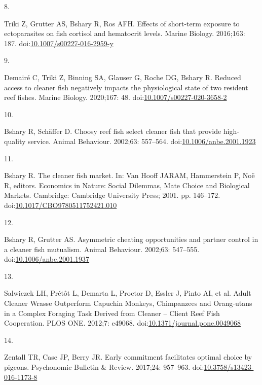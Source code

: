 \documentclass[10pt,letterpaper]{article}
\newlength{\cslhangindent}
\newlength{\csllabelwidth}
\newlength{\cslentryspacingunit} %
\newenvironment{CSLReferences}[2] %
 {%
  \setlength{\parindent}{0pt}
  \ifodd #1
  \let\oldpar\par
  \def\par{\hangindent=\cslhangindent\oldpar}
  \fi
  \setlength{\parskip}{#2\cslentryspacingunit}
 }%
 {}
\newcommand{\CSLLeftMargin}[1]{\parbox[t]{\csllabelwidth}{#1}}
\newcommand{\CSLRightInline}[1]{\parbox[t]{\linewidth - \csllabelwidth}{#1}\break}
\begin{document}
\begin{CSLReferences}{0}{0}
\leavevmode{}%
\CSLLeftMargin{8. }
\CSLRightInline{Triki Z, Grutter AS, Bshary R, Ros AFH. Effects of
short-term exposure to ectoparasites on fish cortisol and hematocrit
levels. Marine Biology. 2016;163: 187.
doi:\href{https://doi.org/10.1007/s00227-016-2959-y}{10.1007/s00227-016-2959-y}}

\leavevmode{}%
\CSLLeftMargin{9. }
\CSLRightInline{Demairé C, Triki Z, Binning SA, Glauser G, Roche DG,
Bshary R. Reduced access to cleaner fish negatively impacts the
physiological state of two resident reef fishes. Marine Biology.
2020;167: 48.
doi:\href{https://doi.org/10.1007/s00227-020-3658-2}{10.1007/s00227-020-3658-2}}

\leavevmode{}%
\CSLLeftMargin{10. }
\CSLRightInline{Bshary R, Schäffer D. Choosy reef fish select cleaner
fish that provide high-quality service. Animal Behaviour. 2002;63:
557--564.
doi:\href{https://doi.org/10.1006/anbe.2001.1923}{10.1006/anbe.2001.1923}}

\leavevmode{}%
\CSLLeftMargin{11. }
\CSLRightInline{Bshary R. The cleaner fish market. In: Van Hooff JARAM,
Hammerstein P, Noë R, editors. Economics in {Nature}: {Social}
{Dilemmas}, {Mate} {Choice} and {Biological} {Markets}. Cambridge:
Cambridge University Press; 2001. pp. 146--172.
doi:\href{https://doi.org/10.1017/CBO9780511752421.010}{10.1017/CBO9780511752421.010}}

\leavevmode{}%
\CSLLeftMargin{12. }
\CSLRightInline{Bshary R, Grutter AS. Asymmetric cheating opportunities
and partner control in a cleaner fish mutualism. Animal Behaviour.
2002;63: 547--555.
doi:\href{https://doi.org/10.1006/anbe.2001.1937}{10.1006/anbe.2001.1937}}

\leavevmode{}%
\CSLLeftMargin{13. }
\CSLRightInline{Salwiczek LH, Prétôt L, Demarta L, Proctor D, Essler J,
Pinto AI, et al. Adult {Cleaner} {Wrasse} {Outperform} {Capuchin}
{Monkeys}, {Chimpanzees} and {Orang}-utans in a {Complex} {Foraging}
{Task} {Derived} from {Cleaner} -- {Client} {Reef} {Fish} {Cooperation}.
PLOS ONE. 2012;7: e49068.
doi:\href{https://doi.org/10.1371/journal.pone.0049068}{10.1371/journal.pone.0049068}}

\leavevmode{}%
\CSLLeftMargin{14. }
\CSLRightInline{Zentall TR, Case JP, Berry JR. Early commitment
facilitates optimal choice by pigeons. Psychonomic Bulletin \& Review.
2017;24: 957--963.
doi:\href{https://doi.org/10.3758/s13423-016-1173-8}{10.3758/s13423-016-1173-8}}


\end{CSLReferences}
\end{document}
